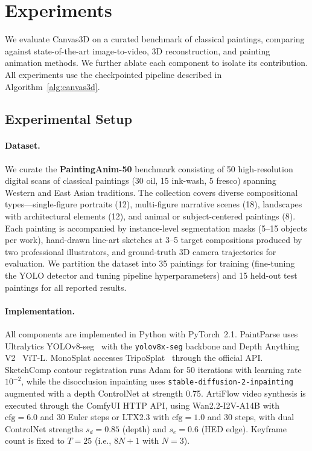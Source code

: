 \section{Experiments}
\label{sec:experiment}

We evaluate Canvas3D on a curated benchmark of classical paintings, comparing
against state-of-the-art image-to-video, 3D reconstruction, and painting
animation methods. We further ablate each component to isolate its
contribution. All experiments use the checkpointed pipeline described in
Algorithm~\ref{alg:canvas3d}.

\subsection{Experimental Setup}

\paragraph{Dataset.}
We curate the \textbf{PaintingAnim-50} benchmark consisting of 50
high-resolution digital scans of classical paintings (30 oil, 15 ink-wash,
5 fresco) spanning Western and East Asian traditions. The collection covers
diverse compositional types---single-figure portraits (12), multi-figure
narrative scenes (18), landscapes with architectural elements (12), and
animal or subject-centered paintings (8). Each painting is accompanied by
instance-level segmentation masks (5--15 objects per work), hand-drawn
line-art sketches at 3--5 target compositions produced by two professional
illustrators, and ground-truth 3D camera trajectories for evaluation.
We partition the dataset into 35 paintings for training (fine-tuning the
YOLO detector and tuning pipeline hyperparameters) and 15 held-out test
paintings for all reported results.

\paragraph{Implementation.}
All components are implemented in Python with PyTorch~2.1. PaintParse uses
Ultralytics YOLOv8-seg~\cite{jocher2023yolov8} with the \texttt{yolov8x-seg}
backbone and Depth Anything V2~\cite{yang2024depthanything} ViT-L. MonoSplat
accesses TripoSplat~\cite{wang2024triposplat} through the official API.
SketchComp contour registration runs Adam for 50 iterations with learning
rate $10^{-2}$, while the disocclusion inpainting uses
\texttt{stable-diffusion-2-inpainting}~\cite{rombach2022ldm} augmented with a
depth ControlNet at strength 0.75. ArtiFlow video synthesis is executed through
the ComfyUI HTTP API, using Wan2.2-I2V-A14B with $\text{cfg}=6.0$ and 30 Euler
steps or LTX2.3 with $\text{cfg}=1.0$ and 30 steps, with dual ControlNet
strengths $s_d=0.85$ (depth) and $s_e=0.6$ (HED edge). Keyframe count is fixed
to $T=25$ (i.e., $8N+1$ with $N=3$).

